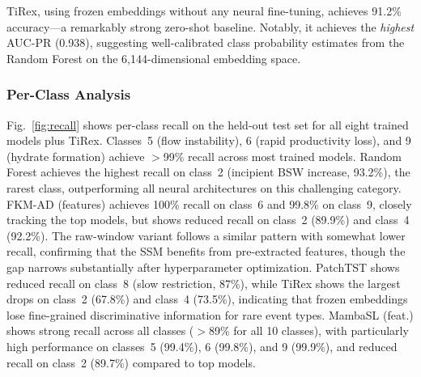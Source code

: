 \documentclass[conference]{IEEEtran}
\begin{document}
TiRex, using frozen embeddings without any neural fine-tuning, achieves 91.2\% accuracy---a remarkably strong zero-shot baseline. Notably, it achieves the \textit{highest} AUC-PR (0.938), suggesting well-calibrated class probability estimates from the Random Forest on the 6{,}144-dimensional embedding space.

\subsubsection{Per-Class Analysis}

Fig.~\ref{fig:recall} shows per-class recall on the held-out test set for all eight trained models plus TiRex. Classes~5 (flow instability), 6 (rapid productivity loss), and 9 (hydrate formation) achieve $>$99\% recall across most trained models. Random Forest achieves the highest recall on class~2 (incipient BSW increase, 93.2\%), the rarest class, outperforming all neural architectures on this challenging category. FKM-AD (features) achieves 100\% recall on class~6 and 99.8\% on class~9, closely tracking the top models, but shows reduced recall on class~2 (89.9\%) and class~4 (92.2\%). The raw-window variant follows a similar pattern with somewhat lower recall, confirming that the SSM benefits from pre-extracted features, though the gap narrows substantially after hyperparameter optimization. PatchTST shows reduced recall on class~8 (slow restriction, 87\%), while TiRex shows the largest drops on class~2 (67.8\%) and class~4 (73.5\%), indicating that frozen embeddings lose fine-grained discriminative information for rare event types. MambaSL (feat.) shows strong recall across all classes ($>$89\% for all 10 classes), with particularly high performance on classes~5 (99.4\%), 6 (99.8\%), and 9 (99.9\%), and reduced recall on class~2 (89.7\%) compared to top models.
\end{document}

